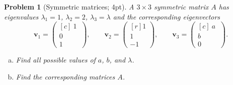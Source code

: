 \documentclass[12pt,a4]{article}
\newtheorem{problem}{Problem}
\newcommand{\bv}{{\mathbf v}}
\begin{document}
\begin{problem}[Symmetric matrices; 4pt]\rm
	A $3\times 3$ symmetric matrix $A$ has eigenvalues $\lambda_1 = 1$, $\lambda_2 = 2$, $\lambda_3 = \lambda$ and the corresponding eigenvectors
	\[
	\bv_1 = \begin{pmatrix}[c] \ 1\ \\ 0 \\ 1 \end{pmatrix}, \qquad
	\bv_2 = \begin{pmatrix}[r]  1 \\ 1 \\ -1 \end{pmatrix}, \qquad
	\bv_3 = \begin{pmatrix}[c] \ a\ \\ b \\ 0 \end{pmatrix}.
	\]
	\begin{enumerate}[(a)]
		\item Find all possible values of $a$, $b$, and $\lambda$.
		\item Find the corresponding matrices $A$.
	\end{enumerate} 
\end{problem}
\end{document}
